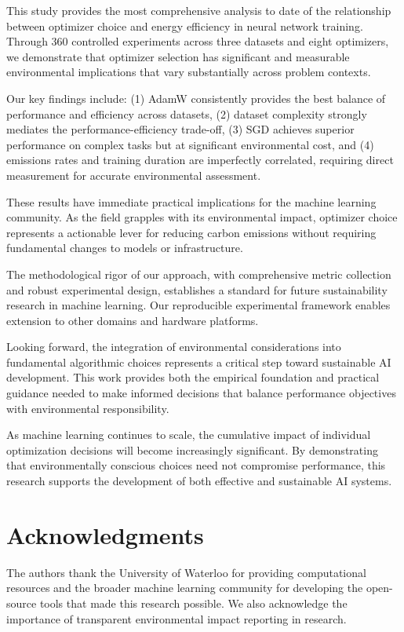\documentclass[conference]{IEEEtran}
\begin{document}
This study provides the most comprehensive analysis to date of the relationship between optimizer choice and energy efficiency in neural network training. Through 360 controlled experiments across three datasets and eight optimizers, we demonstrate that optimizer selection has significant and measurable environmental implications that vary substantially across problem contexts.

Our key findings include: (1) AdamW consistently provides the best balance of performance and efficiency across datasets, (2) dataset complexity strongly mediates the performance-efficiency trade-off, (3) SGD achieves superior performance on complex tasks but at significant environmental cost, and (4) emissions rates and training duration are imperfectly correlated, requiring direct measurement for accurate environmental assessment.

These results have immediate practical implications for the machine learning community. As the field grapples with its environmental impact, optimizer choice represents a actionable lever for reducing carbon emissions without requiring fundamental changes to models or infrastructure.

The methodological rigor of our approach, with comprehensive metric collection and robust experimental design, establishes a standard for future sustainability research in machine learning. Our reproducible experimental framework enables extension to other domains and hardware platforms.

Looking forward, the integration of environmental considerations into fundamental algorithmic choices represents a critical step toward sustainable AI development. This work provides both the empirical foundation and practical guidance needed to make informed decisions that balance performance objectives with environmental responsibility.

As machine learning continues to scale, the cumulative impact of individual optimization decisions will become increasingly significant. By demonstrating that environmentally conscious choices need not compromise performance, this research supports the development of both effective and sustainable AI systems.

\section*{Acknowledgments}

The authors thank the University of Waterloo for providing computational resources and the broader machine learning community for developing the open-source tools that made this research possible. We also acknowledge the importance of transparent environmental impact reporting in research.
\end{document}
